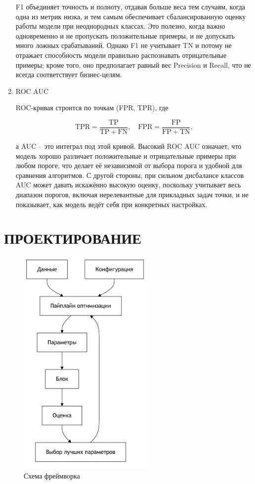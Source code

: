 \documentclass[14pt,a4paper,oneside,openany]{extbook}
\begin{document}
\begin{enumerate}
F1 объединяет точность и полноту, отдавая больше веса тем случаям, когда одна из метрик низка, и тем самым обеспечивает сбалансированную оценку работы модели при неоднородных классах. Это полезно, когда важно одновременно и не пропускать положительные примеры, и не допускать много ложных срабатываний. Однако F1 не учитывает TN и потому не отражает способность модели правильно распознавать отрицательные примеры; кроме того, оно предполагает равный вес Precision и Recall, что не всегда соответствует бизнес-целям.

\item ROC AUC

ROC-кривая строится по точкам (FPR, TPR), где

$$
   \mathrm{TPR} = \frac{\mathrm{TP}}{\mathrm{TP} + \mathrm{FN}},\quad
   \mathrm{FPR} = \frac{\mathrm{FP}}{\mathrm{FP} + \mathrm{TN}},
   $$

а AUC -- это интеграл под этой кривой. Высокий ROC AUC означает, что модель хорошо различает положительные и отрицательные примеры при любом пороге, что делает её независимой от выбора порога и удобной для сравнения алгоритмов. С другой стороны, при сильном дисбалансе классов AUC может давать искажённо высокую оценку, поскольку учитывает весь диапазон порогов, включая нерелевантные для прикладных задач точки, и не показывает, как модель ведёт себя при конкретных настройках.
\end{enumerate}
\chapter{ПРОЕКТИРОВАНИЕ}
\label{sec:orgab468f0}

\begin{figure}[h]
\centering
\includegraphics[width=0.6\textwidth,height=0.5\textheight]{img/mermaid/framework_schema.png}
\caption{\label{fig:framework_schema}Схема фреймворка}
\end{figure}
\end{document}
